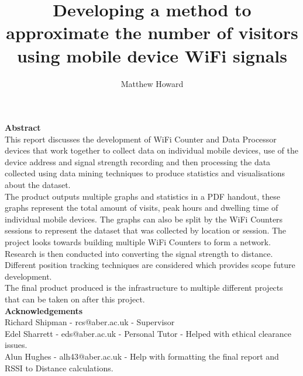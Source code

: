 \documentclass{report}
\title{Developing a method to approximate the number of visitors using mobile device WiFi signals}    %
\author{Matthew Howard}
\date{\parbox{\linewidth}{\centering%
  \today\endgraf
  Department Of Computer Science\endgraf
  Msc Data Science :  CSM9060\endgraf
  Supervisor : Richard Shipman}}
\begin{document}
\maketitle


\clearpage
\tableofcontents
\listoffigures
\listoftables
\clearpage

\clearpage
\begin{center}
    \Huge{\textbf{Abstract}} \\
    \vspace{5mm}
    \normalsize
    This report discusses the development of WiFi Counter and Data Processor devices that work together to collect data on individual mobile devices, use of the device address and signal strength recording and then processing the data collected using data mining techniques to produce statistics and visualisations about the dataset. \\\vspace{2mm} \newline 
    The product outputs multiple graphs and statistics in a PDF handout, these graphs represent the total amount of visits, peak hours and dwelling time of individual mobile devices. The graphs can also be split by the WiFi Counters sessions to represent the dataset that was collected by location or session. The project looks towards building  multiple WiFi Counters to form a network. Research is then conducted into converting the signal strength to distance. Different position tracking techniques are considered which provides scope future development. \\ \vspace{2mm}  \newline
    The final product produced is the infrastructure to multiple different projects that can be taken on after this project. \\ \vspace{2mm}  \newline
    \Huge{\textbf{Acknowledgements}} \\ \newline 
    \vspace{5mm}
    \normalsize
    Richard Shipman -  rcs@aber.ac.uk - Supervisor \\ \vspace{2mm}
    Edel Sharrett - eds@aber.ac.uk - Personal Tutor - Helped with ethical clearance issues. \\ \vspace{2mm}
    Alun Hughes - alh43@aber.ac.uk - Help with formatting the final report and RSSI to Distance calculations. \\ \vspace{2mm}
    
\end{center}
\clearpage
\end{document}
